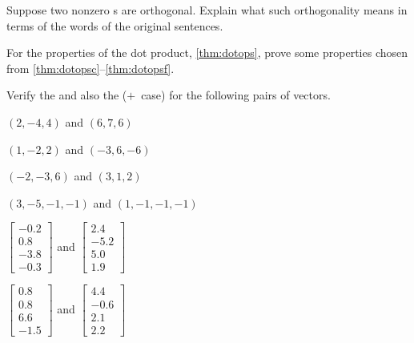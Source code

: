 \begin{exercise}  
Suppose two nonzero s are orthogonal.  
Explain what such orthogonality means in terms of the words of the original sentences.
\end{exercise}






\begin{exercise} \label{ex:dotops} 
For the properties of the dot product, \cref{thm:dotops}, prove some properties chosen from \ref{thm:dotopsc}--\ref{thm:dotopsf}.
\end{exercise}



\begin{exercise}  
Verify the  and also the  (\(+\)~case) for the following pairs of vectors.
\begin{Parts}
\item \((2,-4,4)\) and \((6,7,6)\)
\item \((1,-2,2)\) and \((-3,6,-6)\)
\begin{OmitV1}
\item \((-2,-3,6)\) and \((3,1,2)\)
\item \((3,-5,-1,-1)\) and \((1,-1,-1,-1)\)
\end{OmitV1}
\item \(\begin{bmatrix} -0.2\\0.8\\-3.8\\-0.3 \end{bmatrix}\) and 
\(\begin{bmatrix} 2.4\\-5.2\\5.0\\1.9 \end{bmatrix}\)
\item \(\begin{bmatrix} 0.8\\0.8\\6.6\\-1.5 \end{bmatrix}\) and 
\(\begin{bmatrix} 4.4\\-0.6\\2.1\\2.2 \end{bmatrix}\)
\end{Parts}
\end{exercise}


